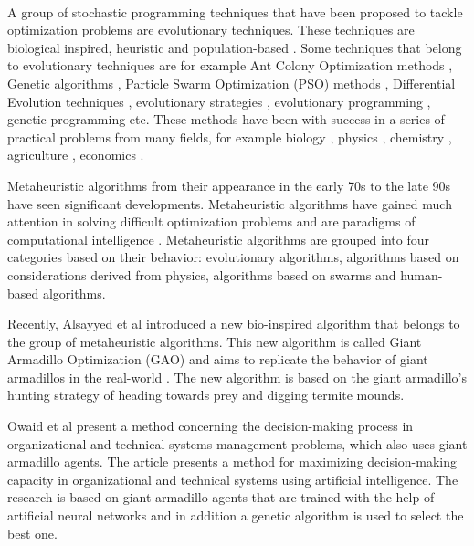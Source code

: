 \documentclass[journal,article,submit,pdftex,moreauthors]{Definitions/mdpi}
\begin{document}
\\
A group of stochastic programming techniques that have been proposed to tackle optimization problems are evolutionary techniques. These techniques are biological inspired, heuristic and population-based \cite{bartz2014evolutionary,simon2013evolutionary}.
Some techniques that belong to evolutionary techniques are for example Ant Colony Optimization methods \cite{aco1, aco2}, Genetic algorithms \cite{geneticReview,jamwal2019evolutionary,wang2020comparative}, Particle Swarm Optimization (PSO) methods \cite{psomajor,psoReview}, Differential Evolution techniques \cite{deprice,deReview}, evolutionary strategies \cite{asselmeyer1997evolutionary,arnold2002noisy}, evolutionary programming \cite{yao1999evolutionary},  genetic programming \cite{stephenson2003genetic}  etc. These methods have been with success in a series of practical problems from many fields, for example biology \cite{banga2008optimization,beites2015chassis}, physics \cite{hartmann2002optimization,hanuka2021physics}, chemistry \cite{ferreira2018multivariate,bechikh2014efficient}, agriculture \cite{ filip2020advanced,zhang2016integrated}, economics \cite{intriligator2002mathematical, dixit1990optimization}.

Metaheuristic algorithms from their appearance in the early 70s to the late 90s have seen significant developments.
Metaheuristic algorithms have gained much attention in solving difficult optimization problems and are paradigms of computational intelligence \cite{meta1,meta2,meta3}. Metaheuristic algorithms are grouped into four categories based on their behavior: evolutionary algorithms, algorithms based on considerations derived from physics,  algorithms based on swarms and human-based algorithms\cite{metadivide}.

Recently, Alsayyed et al \cite{alsayyed2023giant} introduced a new   bio-inspired  algorithm that belongs to the group of metaheuristic algorithms. This new algorithm is called  Giant Armadillo Optimization (GAO) and aims to replicate the behavior of giant armadillos in the real-world \cite{desbiez2021methods}. The new algorithm is based on the giant armadillo's hunting strategy of heading towards prey and digging termite mounds.

Owaid et al present a method \cite{owaid2024development} concerning the decision-making process in organizational and technical systems management problems, which  also uses giant armadillo agents. The article presents a method for maximizing decision-making capacity in organizational and technical systems using artificial intelligence. The research is based on giant armadillo agents that are trained with the help of artificial neural networks \cite{nn1,nn2} and in addition a genetic algorithm is used to select the best one.
\end{document}
